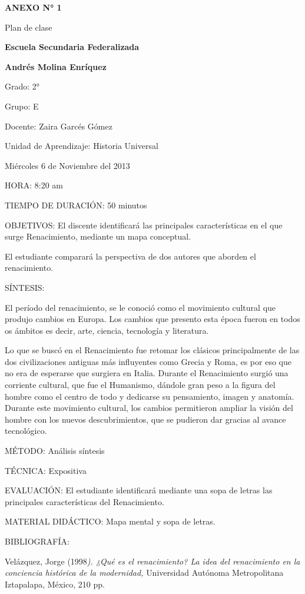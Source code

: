 \begin{footnotesize}
\textbf{ANEXO N° 1}

{Plan de clase }

{\textbf{Escuela Secundaria Federalizada }}

{\textbf{Andrés Molina Enríquez }}

{Grado: 2° }

{Grupo: E }

{Docente: Zaira Garcés Gómez }

{Unidad de Aprendizaje: Historia Universal }

{Miércoles 6 de Noviembre del 2013 }

{HORA: 8:20 am }

{TIEMPO DE DURACIÓN: 50 minutos }

{OBJETIVOS: El discente identificará las principales características en el
que surge Renacimiento, mediante un mapa conceptual. }

{El estudiante comparará la perspectiva de dos autores que aborden el
renacimiento. }

{SÍNTESIS: }

{El período del renacimiento, se le conoció como el movimiento cultural que
produjo cambios en Europa. Los cambios que presento esta época fueron en
todos os ámbitos es decir, arte, ciencia, tecnología y literatura. }

{Lo que se buscó en el Renacimiento fue retomar los clásicos principalmente
de las dos civilizaciones antiguas más influyentes como Grecia y Roma, es
por eso que {no era de esperarse que
surgiera en Italia. Durante el Renacimiento surgió una corriente cultural,
que fue }{el Humanismo, dándole gran
peso a la figura del hombre como el centro de todo y dedicarse su
pensamiento, imagen y anatomía. Durante este movimiento cultural, los
cambios permitieron ampliar la visión del hombre con los nuevos
descubrimientos, que se pudieron dar gracias al avance tecnológico. }}

{{MÉTODO: Análisis síntesis }}

{{TÉCNICA: Expositiva }}

{{EVALUACIÓN: El estudiante identificará
mediante una sopa de letras las principales características del
Renacimiento. }}

{{MATERIAL DIDÁCTICO: Mapa mental y sopa
de letras. }}

{{BIBLIOGRAFÍA: }}

{{Velázquez, Jorge
(1998}\textit{{). ¿Qué es el
renacimiento? La idea del renacimiento en la conciencia histórica de la
modernidad, }}{Universidad Autónoma
Metropolitana Iztapalapa, México, 210 pp. }}



\end{footnotesize}
